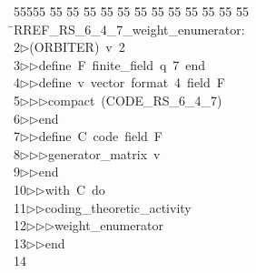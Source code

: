 %
%
\begin{tabbing}
55555 \= 55 \= 55 \= 55 \= 55 \= 55 \= 55 \= 55 \= 55 \= 55 \= 55 \= 55 \= 55 \= \>RREF\_RS\_6\_4\_7\_weight\_enumerator:\\[0pt]
2\>$\triangleright$\>(ORBITER)\ v\ 2\ \\[0pt]
3\>$\triangleright$\>$\triangleright$\>define\ F\ finite\_field\ q\ 7\ end\ \\[0pt]
4\>$\triangleright$\>$\triangleright$\>define\ v\ vector\ format\ 4\ field\ F\ \\[0pt]
5\>$\triangleright$\>$\triangleright$\>$\triangleright$\>compact\ (CODE\_RS\_6\_4\_7)\ \\[0pt]
6\>$\triangleright$\>$\triangleright$\>end\ \\[0pt]
7\>$\triangleright$\>$\triangleright$\>define\ C\ code\ field\ F\ \\[0pt]
8\>$\triangleright$\>$\triangleright$\>$\triangleright$\>generator\_matrix\ v\ \\[0pt]
9\>$\triangleright$\>$\triangleright$\>end\ \\[0pt]
10\>$\triangleright$\>$\triangleright$\>with\ C\ do\ \\[0pt]
11\>$\triangleright$\>$\triangleright$\>coding\_theoretic\_activity\ \\[0pt]
12\>$\triangleright$\>$\triangleright$\>$\triangleright$\>weight\_enumerator\ \\[0pt]
13\>$\triangleright$\>$\triangleright$\>end\\[0pt]
14\>\end{tabbing}
